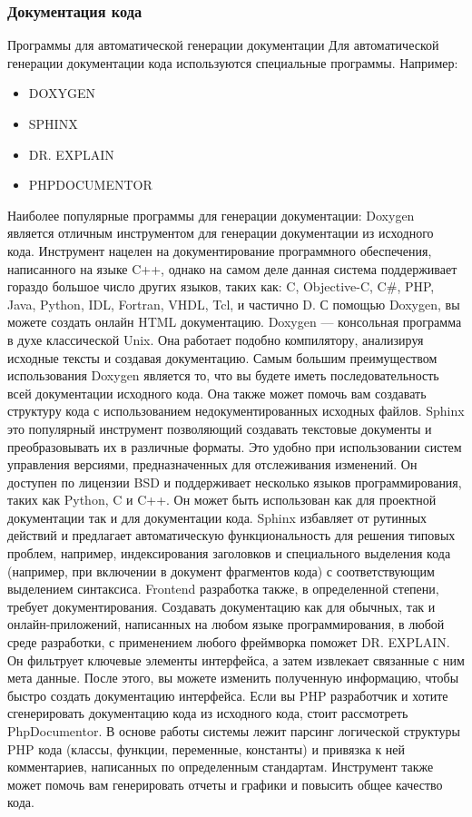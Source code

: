\documentclass{industrial-development}
\begin{document}
\begin{frame} \frametitle{Документация кода}
  \begin{block}{Программы для автоматической генерации документации}
 Для автоматической генерации документации кода используются специальные программы. Например:
  \end{block}
  \begin{itemize}
  \item DOXYGEN
  \item SPHINX
  \item DR. EXPLAIN
  \item PHPDOCUMENTOR
  \end{itemize}
\end{frame}
\lecturenotes
Наиболее популярные программы для генерации документации:
Doxygen является отличным инструментом для генерации документации из исходного кода. Инструмент нацелен на документирование программного обеспечения, написанного на языке C++, однако на самом деле данная система поддерживает гораздо большое число других языков, таких как: C, Objective-C, C#, PHP, Java, Python, IDL, Fortran, VHDL, Tcl, и частично D. С помощью Doxygen, вы можете создать онлайн HTML документацию. Doxygen — консольная программа в духе классической Unix. Она работает подобно компилятору, анализируя исходные тексты и создавая документацию. Самым большим преимуществом использования Doxygen является то, что вы будете иметь последовательность всей документации исходного кода. Она также может помочь вам создавать структуру кода с использованием недокументированных исходных файлов.
Sphinx это популярный инструмент позволяющий создавать текстовые документы и преобразовывать их в различные форматы. Это удобно при использовании систем управления версиями, предназначенных для отслеживания изменений. Он доступен по лицензии BSD и поддерживает несколько языков программирования, таких как Python, C и C++. Он может быть использован как для проектной документации так и для документации кода. Sphinx избавляет от рутинных действий и предлагает автоматическую функциональность для решения типовых проблем, например, индексирования заголовков и специального выделения кода (например, при включении в документ фрагментов кода) с соответствующим выделением синтаксиса.
Frontend разработка также, в определенной степени, требует документирования. Создавать документацию как для обычных, так и онлайн-приложений, написанных на любом языке программирования, в любой среде разработки, с применением любого фреймворка поможет DR. EXPLAIN. Он фильтрует ключевые элементы интерфейса, а затем извлекает связанные с ним мета данные. После этого, вы можете изменить полученную информацию, чтобы быстро создать документацию интерфейса.  
Если вы PHP разработчик и хотите сгенерировать документацию кода из исходного кода, стоит рассмотреть PhpDocumentor. В основе работы системы лежит парсинг логической структуры PHP кода (классы, функции, переменные, константы) и привязка к ней комментариев, написанных по определенным стандартам. Инструмент также может помочь вам генерировать отчеты и графики и повысить общее качество кода.

\begin{thebibliography}{99}
\end{thebibliography}
\end{document}
